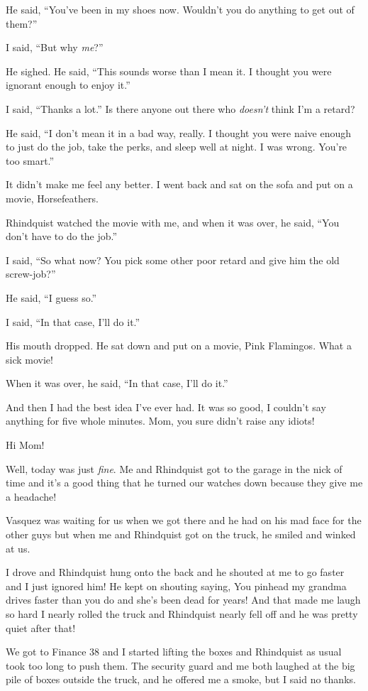He said, “You've been in my shoes now. Wouldn't you do anything to 
get out of them?”

I said, “But why \emph{me}?”

He sighed. He said, “This sounds worse than I mean it. I thought you 
were ignorant enough to enjoy it.”

I said, “Thanks a lot.” Is there anyone out there who 
\emph{doesn't} think I'm a retard?

He said, “I don't mean it in a bad way, really. I thought you were 
naive enough to just do the job, take the perks, and sleep well at 
night. I was wrong. You're too smart.”

It didn't make me feel any better. I went back and sat on the sofa and 
put on a movie, Horsefeathers.

Rhindquist watched the movie with me, and when it was over, he said, 
“You don't have to do the job.”

I said, “So what now? You pick some other poor retard and give him 
the old screw-job?”

He said, “I guess so.”

I said, “In that case, I'll do it.”

His mouth dropped. He sat down and put on a movie, Pink Flamingos. What 
a sick movie!

When it was over, he said, “In that case, I'll do it.”

And then I had the best idea I've ever had. It was so good, I couldn't 
say anything for five whole minutes. Mom, you sure didn't raise any 
idiots!

\tb

Hi Mom!

Well, today was just \emph{fine}. Me and Rhindquist got to the garage 
in the nick of time and it's a good thing that he turned our watches 
down because they give me a headache!

Vasquez was waiting for us when we got there and he had on his mad face 
for the other guys but when me and Rhindquist got on the truck, he 
smiled and winked at us.

I drove and Rhindquist hung onto the back and he shouted at me to go 
faster and I just ignored him! He kept on shouting saying, You pinhead 
my grandma drives faster than you do and she's been dead for years! And 
that made me laugh so hard I nearly rolled the truck and Rhindquist 
nearly fell off and he was pretty quiet after that!

We got to Finance 38 and I started lifting the boxes and Rhindquist as 
usual took too long to push them. The security guard and me both 
laughed at the big pile of boxes outside the truck, and he offered me a 
smoke, but I said no thanks.

